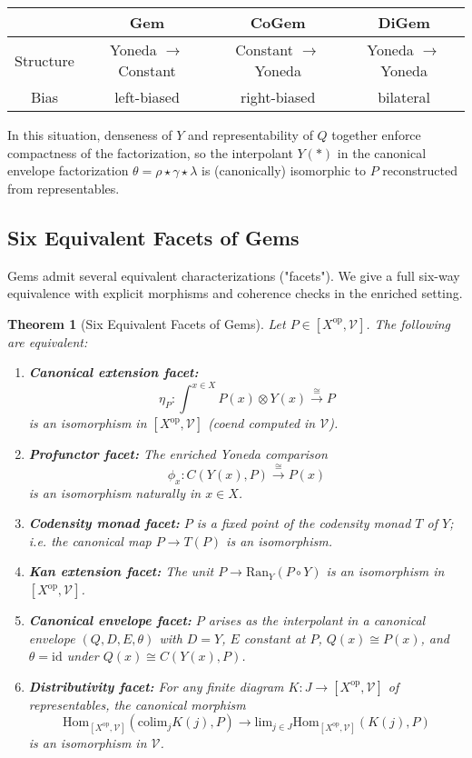 \documentclass[11pt]{article}
\theoremstyle{plain}
\newtheorem{theorem}{Theorem}[section]
\theoremstyle{definition}
\theoremstyle{remark}
\newcommand{\V}{\mathcal{V}}
\newcommand{\op}{\mathrm{op}}
\newcommand{\id}{\mathrm{id}}
\newcommand{\colim}{\mathrm{colim}}
\renewcommand{\lim}{\mathrm{lim}}
\newcommand{\Hom}{\mathrm{Hom}}
\newcommand{\Ran}{\mathrm{Ran}}
\begin{document}
\begin{center}
\begin{tabular}{|c|c|c|c|}
\hline
 & \textbf{Gem} & \textbf{CoGem} & \textbf{DiGem} \\
\hline
Structure & Yoneda $\to$ Constant & Constant $\to$ Yoneda & Yoneda $\to$ Yoneda \\
\hline
Bias & left-biased & right-biased & bilateral \\
\hline
\end{tabular}
\end{center}

In this situation, denseness of $Y$ and representability of $Q$ together enforce compactness of the factorization, so the interpolant $Y(\ast)$ in the canonical envelope factorization $\theta = \rho \star \gamma \star \lambda$ is (canonically) isomorphic to $P$ reconstructed from representables.

\subsection{Six Equivalent Facets of Gems}

Gems admit several equivalent characterizations ("facets"). We give a full six-way equivalence with explicit morphisms and coherence checks in the enriched setting.

\begin{theorem}[Six Equivalent Facets of Gems]
Let $P \in [X^{\op}, \V]$. The following are equivalent:

\begin{enumerate}
\item \textbf{Canonical extension facet:}
$$
\eta_P : \int^{x \in X} P(x) \otimes Y(x) \xrightarrow{\cong} P
$$
is an isomorphism in $[X^{\op}, \V]$ (coend computed in $\V$).

\item \textbf{Profunctor facet:} The enriched Yoneda comparison
$$
\phi_x : C(Y(x), P) \xrightarrow{\cong} P(x)
$$
is an isomorphism naturally in $x \in X$.

\item \textbf{Codensity monad facet:} $P$ is a fixed point of the codensity monad $T$ of $Y$; i.e. the canonical map $P \to T(P)$ is an isomorphism.

\item \textbf{Kan extension facet:} The unit $P \to \Ran_Y(P \circ Y)$ is an isomorphism in $[X^{\op}, \V]$.

\item \textbf{Canonical envelope facet:} $P$ arises as the interpolant in a canonical envelope $(Q, D, E, \theta)$ with $D = Y$, $E$ constant at $P$, $Q(x) \cong P(x)$, and $\theta = \id$ under $Q(x) \cong C(Y(x), P)$.

\item \textbf{Distributivity facet:} For any finite diagram $K : J \to [X^{\op}, \V]$ of representables, the canonical morphism
$$
\Hom_{[X^{\op}, \V]}(\colim_j K(j), P) \to \lim_{j \in J} \Hom_{[X^{\op}, \V]}(K(j), P)
$$
is an isomorphism in $\V$.
\end{enumerate}
\end{theorem}
\end{document}
